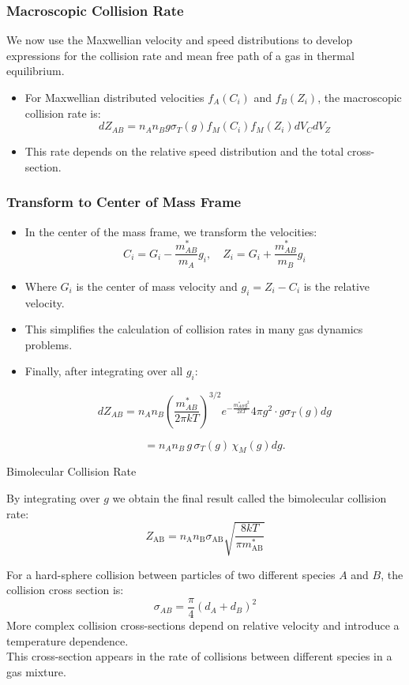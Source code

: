 \documentclass{beamer}
\begin{document}
\begin{frame}
\frametitle{Macroscopic Collision Rate}
We now use the Maxwellian velocity and speed distributions to develop
expressions for the collision rate and mean free path of a gas in thermal equilibrium.\\
\begin{itemize}
    \item For Maxwellian distributed velocities \( f_A(C_i) \) and \( f_B(Z_i) \), the macroscopic collision rate is:
    \[
    dZ_{AB} = n_A n_B g \sigma_T(g) f_M(C_i) f_M(Z_i) dV_C dV_Z
    \]
    \item This rate depends on the relative speed distribution and the total cross-section.
\end{itemize}
\end{frame}

\begin{frame}
\frametitle{Transform to Center of Mass Frame}
\begin{itemize}
    \item In the center of the mass frame, we transform the velocities:
    \[
    C_i = G_i - \frac{m_{AB}^*}{m_A} g_i, \quad Z_i = G_i + \frac{m_{AB}^*}{m_B} g_i
    \]
    \item Where \( G_i \) is the center of mass velocity and \( g_i = Z_i - C_i \) is the relative velocity.
    \item This simplifies the calculation of collision rates in many gas dynamics problems.
    \item Finally, after integrating over all $g_i$:

\[
dZ_{AB} = n_A n_B \left( \frac{m_{AB}^*}{2\pi k T} \right)^{3/2} e^{-\frac{m_{AB}^* g^2}{2 k T}} 4\pi g^2 \cdot g \sigma_T(g) dg
\]

\[
= n_A n_B \, g \, \sigma_T(g) \, \chi_M(g) dg.
\]

\end{itemize}
\end{frame}


\begin{frame}{Bimolecular Collision Rate}

By integrating over $g$  we obtain the final result called the bimolecular collision rate:
$$
Z_{\mathrm{AB}}=n_{\mathrm{A}} n_{\mathrm{B}} \sigma_{\mathrm{AB}} \sqrt{\frac{8 k T}{\pi m_{\mathrm{AB}}^*}}
$$

    For a hard-sphere collision between particles of two different species \( A \) and \( B \), the collision cross section is:
    \[
    \sigma_{AB} = \frac{\pi}{4} (d_A + d_B)^2
    \]
    More complex collision cross-sections depend on relative velocity and introduce a temperature dependence. \\
    \vspace{0.5cm}
    This cross-section appears in the rate of collisions between different species in a gas mixture.
\end{frame}
\end{document}
